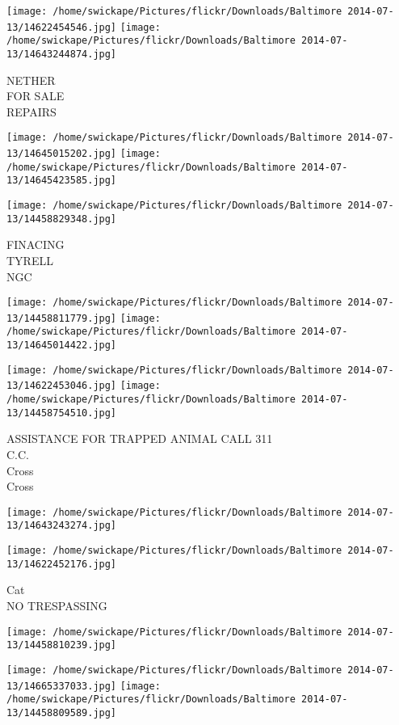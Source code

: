 \documentclass[10pt,letterpaper]{article}
\begin{document}
\vspace{0.25in}
\texttt{[image: /home/swickape/Pictures/flickr/Downloads/Baltimore 2014-07-13/14622454546.jpg]}
\texttt{[image: /home/swickape/Pictures/flickr/Downloads/Baltimore 2014-07-13/14643244874.jpg]}

NETHER\\
FOR SALE\\
REPAIRS
\pagebreak

\texttt{[image: /home/swickape/Pictures/flickr/Downloads/Baltimore 2014-07-13/14645015202.jpg]}
\texttt{[image: /home/swickape/Pictures/flickr/Downloads/Baltimore 2014-07-13/14645423585.jpg]}

\vspace{0.25in}
\texttt{[image: /home/swickape/Pictures/flickr/Downloads/Baltimore 2014-07-13/14458829348.jpg]}

FINACING\\
TYRELL\\
NGC
\pagebreak

\texttt{[image: /home/swickape/Pictures/flickr/Downloads/Baltimore 2014-07-13/14458811779.jpg]}
\texttt{[image: /home/swickape/Pictures/flickr/Downloads/Baltimore 2014-07-13/14645014422.jpg]}

\texttt{[image: /home/swickape/Pictures/flickr/Downloads/Baltimore 2014-07-13/14622453046.jpg]}
\texttt{[image: /home/swickape/Pictures/flickr/Downloads/Baltimore 2014-07-13/14458754510.jpg]}

ASSISTANCE FOR TRAPPED ANIMAL CALL 311\\
C.C.\\
Cross\\
Cross
\pagebreak

\texttt{[image: /home/swickape/Pictures/flickr/Downloads/Baltimore 2014-07-13/14643243274.jpg]}

\vspace{0.25in}
\texttt{[image: /home/swickape/Pictures/flickr/Downloads/Baltimore 2014-07-13/14622452176.jpg]}

Cat\\
NO TRESPASSING
\pagebreak

\texttt{[image: /home/swickape/Pictures/flickr/Downloads/Baltimore 2014-07-13/14458810239.jpg]}

\vspace{0.25in}
\texttt{[image: /home/swickape/Pictures/flickr/Downloads/Baltimore 2014-07-13/14665337033.jpg]}
\texttt{[image: /home/swickape/Pictures/flickr/Downloads/Baltimore 2014-07-13/14458809589.jpg]}
\end{document}

